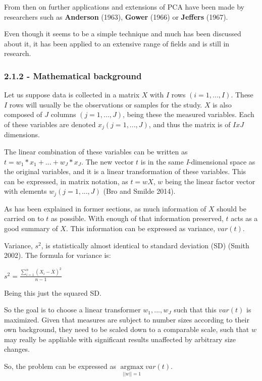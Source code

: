 \documentclass[]{article}
\begin{document}
From then on further applications and extensions of PCA have been made
by researchers such as \textbf{Anderson} (1963), \textbf{Gower} (1966)
or \textbf{Jeffers} (1967).

Even though it seems to be a simple technique and much has been
discussed about it, it has been applied to an extensive range of fields
and is still in research.

\subsubsection{2.1.2 - Mathematical
background}\label{mathematical-background}

Let us suppose data is collected in a matrix \(X\) with \(I\) rows
\((i = 1,...,I)\). These \(I\) rows will usually be the observations or
samples for the study. \(X\) is also composed of \(J\) columns
\((j = 1,...,J)\), being these the measured variables. Each of these
variables are denoted \(x_j (j=1,...,J)\), and thus the matrix is of
\(I x J\) dimensions.

The linear combination of these variables can be written as
\(t = w_1 * x_1 + ... + w_J * x_J\). The new vector \(t\) is in the same
\emph{I}-dimensional space as the original variables, and it is a linear
transformation of these variables. This can be expressed, in matrix
notation, as \(t = wX\), \(w\) being the linear factor vector with
elements \(w_j (j = 1,..., J)\) (Bro and Smilde 2014).

As has been explained in former sections, as much information of \(X\)
should be carried on to \(t\) as possible. With enough of that
information preserved, \(t\) acts as a good summary of \(X\). This
information can be expressed as variance, \(var(t)\).

Variance, \(s^2\), is statistically almost identical to standard
deviation (SD) (Smith 2002). The formula for variance is:

\(s^2 = \frac{\sum_{i=1}^n(X_i - \bar{X})^2}{n - 1}\)

Being this just the squared SD.

So the goal is to choose a linear transformer \(w_1,...,w_J\) such that
this \(var(t)\) is maximized. Given that measures are subject to number
sizes according to their own background, they need to be scaled down to
a comparable scale, such that \(w\) may really be appliable with
significant results unaffected by arbitrary size changes.

So, the problem can be expressed as
\(\underset{||w|| = 1}{\operatorname{argmax}} var(t)\).
\end{document}
